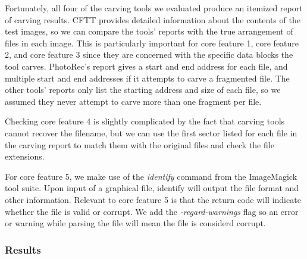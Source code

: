 Fortunately, all four of the carving tools we evaluated produce an itemized report of carving results. CFTT provides detailed information about the contents of the test images, so we can compare the tools' reports with the true arrangement of files in each image. This is particularly important for core feature 1, core feature 2, and core feature 3 since they are concerned with the specific data blocks the tool carves. PhotoRec's report gives a start and end address for each file, and multiple start and end addresses if it attempts to carve a fragmented file. The other tools' reports only list the starting address and size of each file, so we assumed they never attempt to carve more than one fragment per file.

Checking core feature 4 is slightly complicated by the fact that carving tools cannot recover the filename, but we can use the first sector listed for each file in the carving report to match them with the original files and check the file extensions.

For core feature 5, we make use of the \emph{identify} command from the ImageMagick~\cite{imagemagick} tool suite. Upon input of a graphical file, identify will output the file format and other information. Relevant to core feature 5 is that the return code will indicate whether the file is valid or corrupt. We add the \emph{-regard-warnings} flag so an error or warning while parsing the file will mean the file is considerd corrupt.

\subsubsection{Results}

